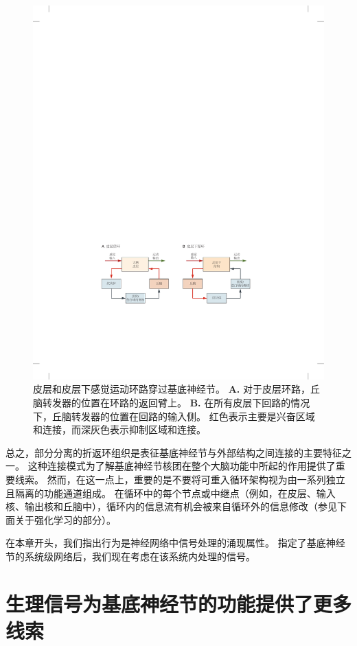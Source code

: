 \begin{figure}[htbp]
	\centering
	\includegraphics[width=0.86\linewidth]{chap38/fig_38_5}
	\caption{皮层和皮层下感觉运动环路穿过基底神经节。
		\textbf{A.} 对于皮层环路，丘脑转发器的位置在环路的返回臂上。
		\textbf{B.} 在所有皮层下回路的情况下，丘脑转发器的位置在回路的输入侧。
		红色表示主要是兴奋区域和连接，而深灰色表示抑制区域和连接。}
	\label{fig:38_5}
\end{figure}


总之，部分分离的折返环组织是表征基底神经节与外部结构之间连接的主要特征之一。
这种连接模式为了解基底神经节核团在整个大脑功能中所起的作用提供了重要线索。
然而，在这一点上，重要的是不要将可重入循环架构视为由一系列独立且隔离的功能通道组成。
在循环中的每个节点或中继点（例如，在皮层、输入核、输出核和丘脑中），循环内的信息流有机会被来自循环外的信息修改（参见下面关于强化学习的部分）。


在本章开头，我们指出行为是神经网络中信号处理的涌现属性。
指定了基底神经节的系统级网络后，我们现在考虑在该系统内处理的信号。



\section{生理信号为基底神经节的功能提供了更多线索}

